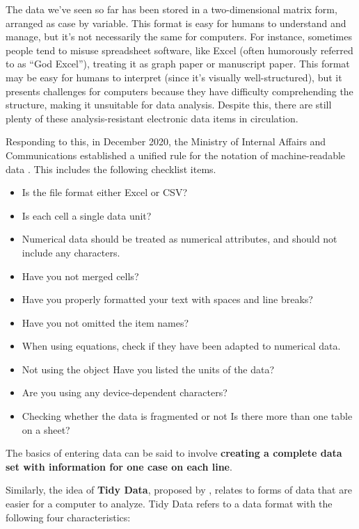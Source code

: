 \documentclass[
  a4paper,
]{book}
\providecommand{\tightlist}{%
  \setlength{\itemsep}{0pt}\setlength{\parskip}{0pt}}\usepackage{longtable,booktabs,array}
\begin{document}
The data we've seen so far has been stored in a two-dimensional matrix
form, arranged as case by variable. This format is easy for humans to
understand and manage, but it's not necessarily the same for computers.
For instance, sometimes people tend to misuse spreadsheet software, like
Excel (often humorously referred to as ``God Excel''), treating it as
graph paper or manuscript paper. This format may be easy for humans to
interpret (since it's visually well-structured), but it presents
challenges for computers because they have difficulty comprehending the
structure, making it unsuitable for data analysis. Despite this, there
are still plenty of these analysis-resistant electronic data items in
circulation.

Responding to this, in December 2020, the Ministry of Internal Affairs
and Communications established a unified rule for the notation of
machine-readable data \autocite{soumu}. This includes the following
checklist items.

\begin{itemize}
\tightlist
\item
  Is the file format either Excel or CSV?
\item
  Is each cell a single data unit?
\item
  Numerical data should be treated as numerical attributes, and should
  not include any characters.
\item
  Have you not merged cells?
\item
  Have you properly formatted your text with spaces and line breaks?
\item
  Have you not omitted the item names?
\item
  When using equations, check if they have been adapted to numerical
  data.
\item
  Not using the object Have you listed the units of the data?
\item
  Are you using any device-dependent characters?
\item
  Checking whether the data is fragmented or not Is there more than one
  table on a sheet?
\end{itemize}

The basics of entering data can be said to involve \textbf{creating a
complete data set with information for one case on each line}.

Similarly, the idea of \textbf{Tidy Data}, proposed by
\textcite{Hadley2014}, relates to forms of data that are easier for a
computer to analyze. Tidy Data refers to a data format with the
following four characteristics:
\end{document}
